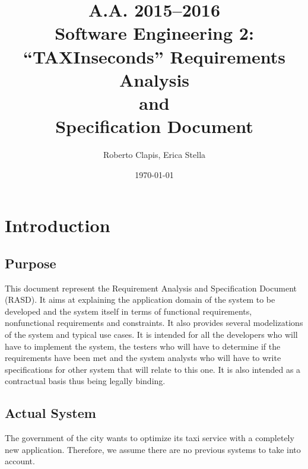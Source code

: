 \documentclass{article}
\author{Roberto Clapis, Erica Stella}
\date{\today}
\title{A.A. 2015--2016
	\\Software Engineering 2: ``TAXInseconds''
	\textbf{R}equirements \textbf{A}nalysis \\ and \\ \textbf{S}pecification \textbf{D}ocument}
\begin{document}
	\maketitle
	\clearpage
	\tableofcontents
	\clearpage

	\section{Introduction}

	\subsection{Purpose}
	This document represent the Requirement Analysis and Speciﬁcation Document (RASD). It aims at explaining the application domain of the system to be developed and the system itself in terms of functional requirements, nonfunctional requirements and constraints. It also provides several modelizations of the system and typical use cases. It is intended for all the developers who will have to implement the system, the testers who will have to determine if the requirements have been met and the system analysts who will have to write specifications for other system that will relate to this one. It is also intended as a contractual basis thus being legally binding.

	\subsection{Actual System}
	The government of the city wants to optimize its taxi service with a completely new application. Therefore, we assume there are no previous systems to take into account.
\end{document}

